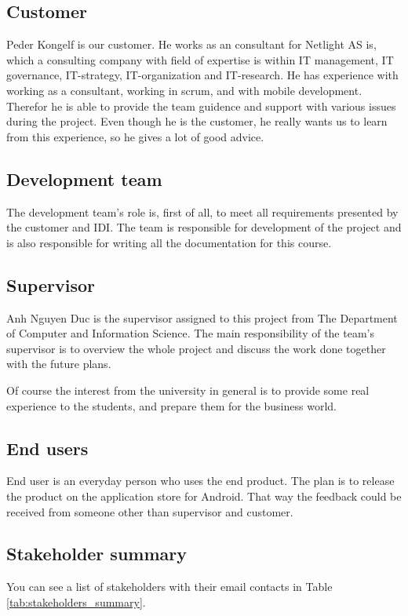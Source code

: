 \subsection{Customer}
Peder Kongelf is our customer. He works as an consultant for Netlight AS is, which a consulting company with field of expertise is within IT management, IT governance, IT-strategy, IT-organization and IT-research. He has experience with working as a consultant, working in scrum,  and with mobile development. Therefor he is able to provide the team guidence and support with various issues during the project. Even though he is the customer, he really wants us to learn from this experience, so he gives a lot of good advice.      

\subsection{Development team}
The development team's role is, first of all, to meet all requirements presented by the customer and IDI. 
The team is responsible for development of the project and is also responsible for writing all the documentation for this course.  

\subsection{Supervisor}

Anh Nguyen Duc is the supervisor assigned to this project from The Department of Computer and Information Science. 
The main responsibility of the team's supervisor is to overview the whole project and discuss the work done together with the future plans. 

Of course the interest from the university in general is to provide some real experience to the students, and prepare them for the business world.

\subsection{End users}
End user is an everyday person who uses the end product. The plan is to release the product on the application store for Android. That way the feedback could be received from someone other than supervisor and customer. 

\subsection{Stakeholder summary}
You can see a list of stakeholders with their email contacts in Table \ref{tab:stakeholders_summary}.

